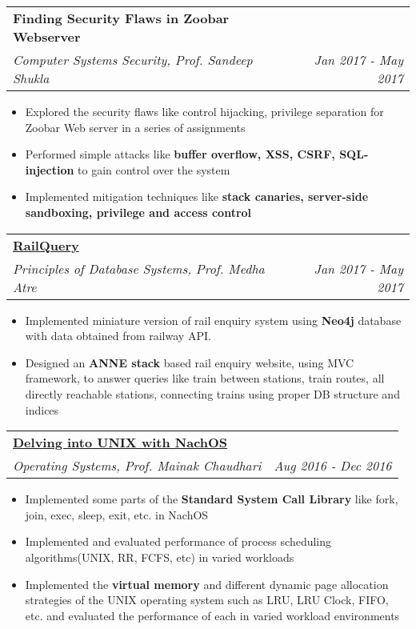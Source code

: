 \documentclass[letterpaper,11pt]{article}
\makeatletter
\newcommand{\resumeItem}[1]{
  \item\small{
    #1 \vspace{-2pt}
  }
}
\newcommand{\resumeSubheadingSpecial}[4]{
  \vspace{-1pt}\item
    \begin{tabular*}{0.97\textwidth}{l@{\extracolsep{\fill}}r}
      \textbf{#1} & #2 \\
      \textit{\small#3} & \textit{\small #4} \\
    \end{tabular*}\vspace{-5pt}
}
\newcommand{\resumeItemListStart}{\begin{itemize}[leftmargin=5mm]}
\newcommand{\resumeItemListEnd}{\end{itemize}\vspace{-5pt}}
\makeatother
\begin{document}
    \resumeSubheadingSpecial
      {Finding Security Flaws in Zoobar Webserver}
      {}{Computer Systems Security, Prof. Sandeep Shukla}{Jan 2017 - May 2017}
      \resumeItemListStart
        \resumeItem
          {Explored the security flaws like control hijacking, privilege separation for Zoobar Web server in a series of assignments}
        \resumeItem
        {Performed simple attacks like \textbf{buffer overflow, XSS, CSRF, SQL-injection} to gain control over the system}
        \resumeItem
        {Implemented mitigation techniques like \textbf{stack canaries, server-side sandboxing, privilege and access control}}
      \resumeItemListEnd

    \resumeSubheadingSpecial
      {\href{https://github.com/tulsyan/railquery}{RailQuery}}
      {}{Principles of Database Systems, Prof. Medha Atre}{Jan 2017 - May 2017}
      \resumeItemListStart
        \resumeItem
        {Implemented miniature version of rail enquiry system using \textbf{Neo4j} database with data obtained from railway API.}
        \resumeItem
          {Designed an \textbf{ANNE stack} based rail enquiry website, using MVC framework, to answer queries like train between stations, train routes, all directly reachable stations, connecting trains using proper DB structure and indices}
      \resumeItemListEnd
      
    \resumeSubheadingSpecial
      {\href{https://bitbucket.org/arhamchopra11/nachos-assignments}{Delving into UNIX with NachOS}}
      {}{Operating Systems, Prof. Mainak Chaudhari}{Aug 2016 - Dec 2016}
      \resumeItemListStart
        \resumeItem
          {Implemented some parts of the \textbf{Standard System Call Library} like fork, join, exec, sleep, exit, etc. in NachOS}
        \resumeItem
          {Implemented and evaluated performance of process scheduling algorithms(UNIX, RR, FCFS, etc) in varied workloads}
        \resumeItem
        {Implemented the \textbf{virtual memory} and different dynamic page allocation strategies of the UNIX operating system such as LRU, LRU Clock, FIFO, etc. and evaluated the performance of each in varied workload environments}
      \resumeItemListEnd
      
\end{document}
